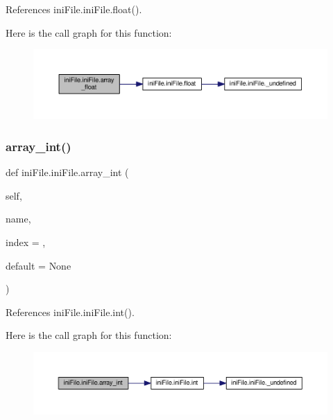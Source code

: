 References ini\+File.\+ini\+File.\+float().

Here is the call graph for this function\+:
\nopagebreak
\begin{figure}[H]
\begin{center}
\leavevmode
\includegraphics[width=350pt]{classiniFile_1_1iniFile_a6608bf642e15eb6992c3279c2902dc39_cgraph}
\end{center}
\end{figure}
\mbox{\label{classiniFile_1_1iniFile_a23da7a086705b52cbf4d55bafbe0f3da}} 
\subsubsection{\texorpdfstring{array\+\_\+int()}{array\_int()}}
{\footnotesize\ttfamily def ini\+File.\+ini\+File.\+array\+\_\+int (\begin{DoxyParamCaption}\item[{}]{self,  }\item[{}]{name,  }\item[{}]{index = {},  }\item[{}]{default = {\ttfamily None} }\end{DoxyParamCaption})}



References ini\+File.\+ini\+File.\+int().

Here is the call graph for this function\+:
\nopagebreak
\begin{figure}[H]
\begin{center}
\leavevmode
\includegraphics[width=350pt]{classiniFile_1_1iniFile_a23da7a086705b52cbf4d55bafbe0f3da_cgraph}
\end{center}
\end{figure}
\mbox{\label{classiniFile_1_1iniFile_a7f2eb7ebbb9192e7fb7ecefe01133444}} 
